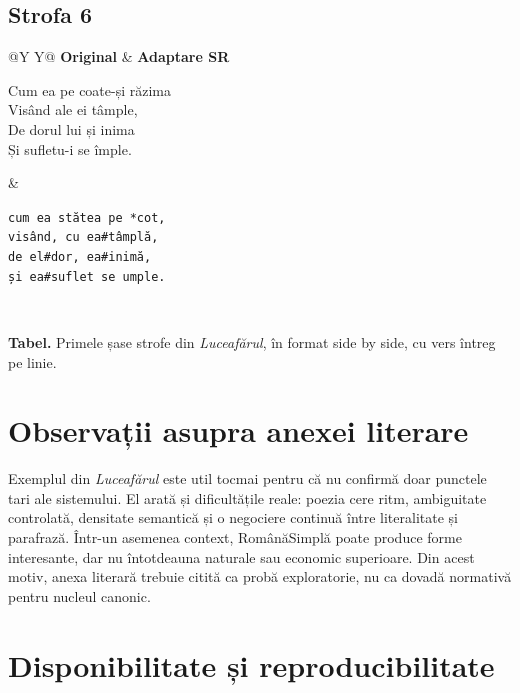 \documentclass[12pt,onecolumn,letterpaper]{article}
\newcommand{\rs}[1]{\texttt{#1}}
\begin{document}
\subsection*{Strofa 6}
\noindent
\begin{tabularx}{\linewidth}{@{}Y Y@{}}
\textbf{Original} & \textbf{Adaptare SR} \\
\begin{minipage}[t]{\linewidth}\vspace{0pt}
Cum ea pe coate-și răzima\\
Visând ale ei tâmple,\\
De dorul lui și inima\\
Și sufletu-i se împle.
\end{minipage}
&
\begin{minipage}[t]{\linewidth}\vspace{0pt}
\rs{cum ea stătea pe *cot,}\\
\rs{visând, cu ea\#tâmplă,}\\
\rs{de el\#dor, ea\#inimă,}\\
\rs{și ea\#suflet se umple.}
\end{minipage}
\\
\end{tabularx}

\normalsize

\begin{center}
\small\textbf{Tabel.} Primele șase strofe din \textit{Luceafărul}, în format side by side, cu vers întreg pe linie.
\end{center}

\section{Observații asupra anexei literare}

Exemplul din \textit{Luceafărul} este util tocmai pentru că nu confirmă doar
punctele tari ale sistemului. El arată și dificultățile reale: poezia cere ritm,
ambiguitate controlată, densitate semantică și o negociere continuă între
literalitate și parafrază. Într-un asemenea context, RomânăSimplă poate produce
forme interesante, dar nu întotdeauna naturale sau economic superioare. Din
acest motiv, anexa literară trebuie citită ca probă exploratorie, nu ca dovadă
normativă pentru nucleul canonic.

\section{Disponibilitate și reproducibilitate}
\end{document}
